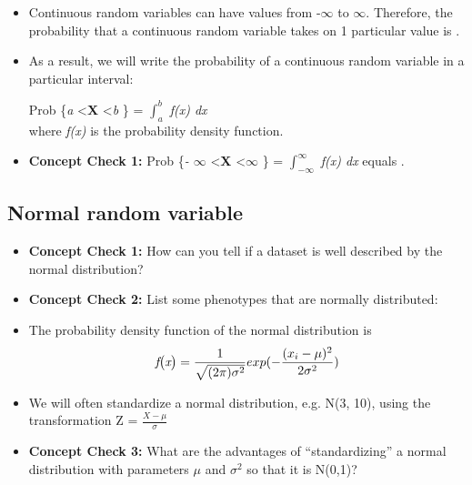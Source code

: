 \documentclass[12pt]{report}
\begin{document}
\begin{itemize}

\item Continuous random variables can have values from -$\infty$ to $\infty$. Therefore, the probability that a continuous random variable takes on 1 particular value is \hrulefill. 

\item As a result, we will write the probability of a continuous random variable in a particular interval:

\bigskip
Prob \{\textit{a} \textless \textbf{X} \textless \textit{b} \} = $\int_{a}^{b}$ \textit{f\big(x\big) dx} \\

where \textit{f\big(x\big)} is the probability density function. 

\item \textbf{Concept Check 1:} Prob \{\textit{- $\infty$} \textless \textbf{X} \textless \textit{$\infty$} \} = $\int_{- \infty}^{\infty}$ \textit{f\big(x\big) dx} equals \hrulefill.

\end{itemize}

\subsection{Normal random variable}

\begin{itemize}

\item  \textbf{Concept Check 1:} How can you tell if a dataset is well described by the normal distribution? 

\bigskip

\bigskip

\bigskip

\item \textbf{Concept Check 2:} List some phenotypes that are normally distributed:

\bigskip

\bigskip

\bigskip

\item The probability density function of the normal distribution is 
\begin{eqnarray}
\textit{f\big(x\big)} = \frac{1}{\sqrt{(2\pi)\sigma^{2}}} exp(-\frac{(x_{i}-\mu)^{2}}{2\sigma^{2}} )
\end{eqnarray}

\bigskip
\item We will often standardize a normal distribution, e.g. N(3, 10), using the transformation Z = 
$\frac{\textit{X} - \mu}{\sigma}$


\item  \textbf{Concept Check 3:} What are the advantages of ``standardizing'' a normal distribution with parameters $\mu$ and $\sigma^{2}$ so that it is N(0,1)?

\end{itemize}
\end{document}
